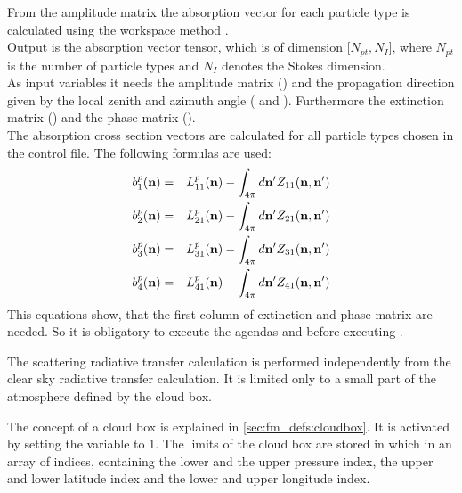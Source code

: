 From the amplitude matrix the absorption vector for each
particle type is calculated using the workspace method
.\\
Output is the absorption vector tensor, which is  of  dimension
[$N_{pt}, N_{I}$], where $N_{pt}$ is the number of particle
types  and $N_{I}$ denotes the Stokes dimension.\\
As input variables it needs the amplitude matrix ()
and the propagation direction given by the local zenith and azimuth
angle ( and ). Furthermore the extinction
matrix () and the phase matrix
().\\
The absorption cross section vectors \SAbVec{} are
calculated for all particle types chosen in the control
file. The following formulas are used:
\begin{eqnarray}
  \label{eq:gen_abs_vector}
  b^p_1({\bf n}) &=&  L^p_{11}({\bf n}) - \int_{4\pi} d{\bf n'}
  Z_{11}({\bf n, n'})\\
  b^p_2({\bf n}) &=&  L^p_{21}({\bf n}) - \int_{4\pi} d{\bf n'}
  Z_{21}({\bf n, n'})\\
  b^p_3({\bf n}) &=&  L^p_{31}({\bf n}) - \int_{4\pi} d{\bf n'}
  Z_{31}({\bf n, n'})\\
  b^p_4({\bf n}) &=&  L^p_{41}({\bf n}) - \int_{4\pi} d{\bf n'}
  Z_{41}({\bf n, n'})
\end{eqnarray}
This equations show, that the first column of extinction and phase
matrix are needed. So it is obligatory to execute the agendas
 and 
 before executing
. 



\label{sec:scattering:scat_meth_rt}

The scattering radiative transfer calculation is performed
independently from the clear sky radiative transfer calculation. It is
limited only to a small part of the atmosphere defined by the cloud box.

\label{sec:scattering:cloudbox}


The concept of a cloud box is explained in
\ref{sec:fm_defs:cloudbox}. It is activated by setting the variable
 to 1. The
limits of the cloud box are stored in 
which in an array of indices, containing the lower and the upper
pressure index, the upper and lower latitude index and the lower and
upper longitude index. 

